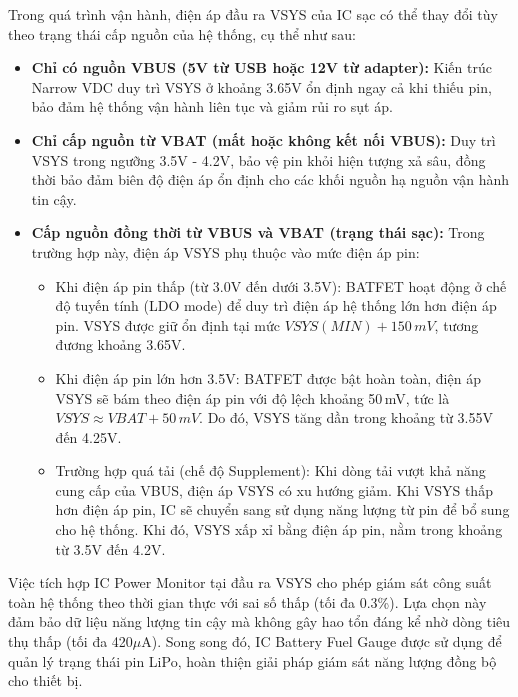             Trong quá trình vận hành, điện áp đầu ra VSYS của IC sạc có thể thay đổi tùy theo trạng thái cấp nguồn của hệ thống, cụ thể như sau:
            \begin{itemize}
                \item \textbf{Chỉ có nguồn VBUS (5V từ USB hoặc 12V từ adapter):} 
                Kiến trúc Narrow VDC duy trì VSYS ở khoảng 3.65V ổn định ngay cả khi thiếu pin, bảo đảm hệ thống vận hành liên tục và giảm rủi ro sụt áp.

                \item \textbf{Chỉ cấp nguồn từ VBAT (mất hoặc không kết nối VBUS):} 
                Duy trì VSYS trong ngưỡng 3.5V - 4.2V, bảo vệ pin khỏi hiện tượng xả sâu, đồng thời bảo đảm biên độ điện áp ổn định cho các khối nguồn hạ nguồn vận hành tin cậy.

                \item \textbf{Cấp nguồn đồng thời từ VBUS và VBAT (trạng thái sạc):}
                Trong trường hợp này, điện áp VSYS phụ thuộc vào mức điện áp pin:
                \begin{itemize}
                    \item Khi điện áp pin thấp (từ 3.0V đến dưới 3.5V): 
                    BATFET hoạt động ở chế độ tuyến tính (LDO mode) để duy trì điện áp hệ thống lớn hơn điện áp pin. VSYS được giữ ổn định tại mức $VSYS(MIN) + 150\,mV$, tương đương khoảng 3.65V.

                    \item Khi điện áp pin lớn hơn 3.5V: 
                    BATFET được bật hoàn toàn, điện áp VSYS sẽ bám theo điện áp pin với độ lệch khoảng 50\,mV, tức là $VSYS \approx VBAT + 50\,mV$. Do đó, VSYS tăng dần trong khoảng từ 3.55V đến 4.25V.

                    \item Trường hợp quá tải (chế độ Supplement): 
                    Khi dòng tải vượt khả năng cung cấp của VBUS, điện áp VSYS có xu hướng giảm. Khi VSYS thấp hơn điện áp pin, IC sẽ chuyển sang sử dụng năng lượng từ pin để bổ sung cho hệ thống. Khi đó, VSYS xấp xỉ bằng điện áp pin, nằm trong khoảng từ 3.5V đến 4.2V.
                \end{itemize}
            \end{itemize}

            Việc tích hợp IC Power Monitor tại đầu ra VSYS cho phép giám sát công suất toàn hệ thống theo thời gian thực với sai số thấp (tối đa 0.3\%). Lựa chọn này đảm bảo dữ liệu năng lượng tin cậy mà không gây hao tổn đáng kể nhờ dòng tiêu thụ thấp (tối đa 420$\mu$A). Song song đó, IC Battery Fuel Gauge được sử dụng để quản lý trạng thái pin LiPo, hoàn thiện giải pháp giám sát năng lượng đồng bộ cho thiết bị.

